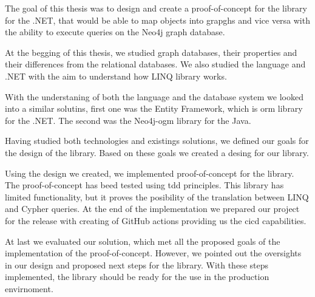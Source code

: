 \begin{conclusion}

    The goal of this thesis was to design and create a proof-of-concept for the library for the .NET, that would be able to map objects into grapghs
    and vice versa with the ability to execute queries on the Neo4j graph database.

    At the begging of this thesis, we studied graph databases, their properties and their differences from the relational databases.
    We also studied the \CS language and .NET with the aim to understand how LINQ library works.

    With the understaning of both the language and the database system we looked into a similar solutins, first one was the
    Entity Framework, which is \acrshort{orm} library for the .NET. The second was the Neo4j-\acrshort{ogm} library for the Java.

    Having studied both technologies and existings solutions, we defined our goals for the design of the library. Based on these goals
    we created a desing for our library.

    Using the design we created, we implemented proof-of-concept for the library. The proof-of-concept has beed tested using \acrshort{tdd}
    principles. This library has limited functionality, but it proves the posibility of the translation between LINQ and Cypher queries.
    At the end of the implementation we prepared our project for the release with creating of GitHub actions providing us the \acrshort{cicd}
    capabilities.

    At last we evaluated our solution, which met all the proposed goals of the implementation of the proof-of-concept.
    However, we pointed out the oversights in our design and proposed next steps for the library.
    With these steps implemented, the library should be ready for the use in the production envirnoment.


\end{conclusion}